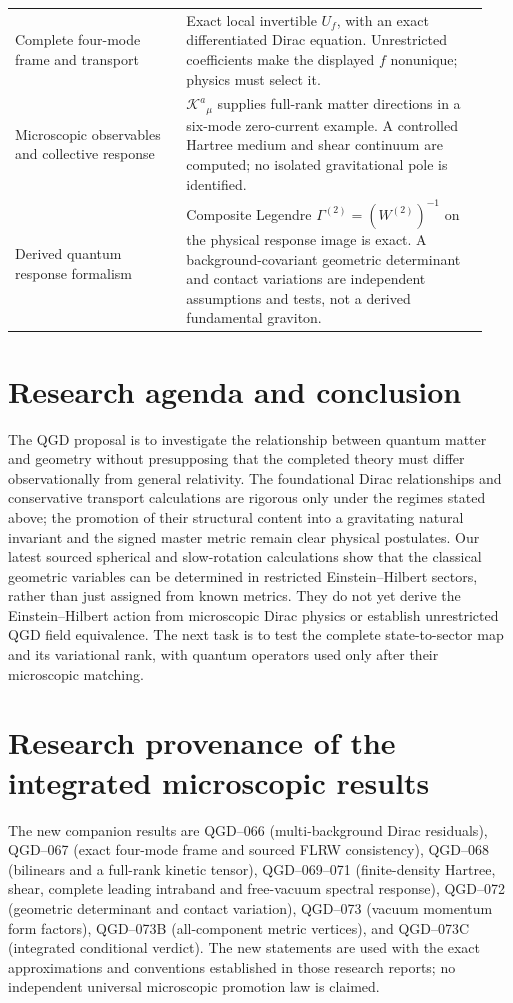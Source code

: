 \documentclass[11pt,a4paper]{article}
\begin{document}
\begin{longtable}{@{}p{0.34\linewidth}p{0.60\linewidth}@{}}
Complete four-mode frame and transport & Exact local invertible $U_f$, with an exact differentiated Dirac equation. Unrestricted coefficients make the displayed $f$ nonunique; physics must select it.\\
Microscopic observables and collective response & $\mathcal K^a{}_{\mu}$ supplies full-rank matter directions in a six-mode zero-current example. A controlled Hartree medium and shear continuum are computed; no isolated gravitational pole is identified.\\
Derived quantum response formalism & Composite Legendre $\Gamma^{(2)}=(W^{(2)})^{-1}$ on the physical response image is exact. A background-covariant geometric determinant and contact variations are independent assumptions and tests, not a derived fundamental graviton.\\
\bottomrule
\end{longtable}

\section{Research agenda and conclusion}\label{sec:conclusion}
The QGD proposal is to investigate the relationship between quantum matter and geometry without presupposing that the completed theory must differ observationally from general relativity. The foundational Dirac relationships and conservative transport calculations are rigorous only under the regimes stated above; the promotion of their structural content into a gravitating natural invariant and the signed master metric remain clear physical postulates. Our latest sourced spherical and slow-rotation calculations show that the classical geometric variables can be determined in restricted Einstein--Hilbert sectors, rather than just assigned from known metrics. They do not yet derive the Einstein--Hilbert action from microscopic Dirac physics or establish unrestricted QGD field equivalence. The next task is to test the complete state-to-sector map and its variational rank, with quantum operators used only after their microscopic matching.


\section{Research provenance of the integrated microscopic results}\label{sec:qgd075-micro-provenance}
The new companion results are QGD--066 (multi-background Dirac
residuals), QGD--067 (exact four-mode frame and sourced FLRW
consistency), QGD--068 (bilinears and a full-rank kinetic tensor),
QGD--069--071 (finite-density Hartree, shear, complete leading intraband
and free-vacuum spectral response), QGD--072 (geometric determinant and
contact variation), QGD--073 (vacuum momentum form factors),
QGD--073B (all-component metric vertices), and QGD--073C (integrated
conditional verdict). The new statements are used with the exact
approximations and conventions established in those research reports;
no independent universal microscopic promotion law is claimed.
\end{document}
